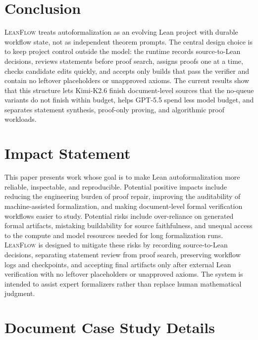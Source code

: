 \documentclass{article}
\newcommand{\method}{\textsc{LeanFlow}\xspace}
\newcommand{\kimi}{Kimi-K2.6\xspace}
\newcommand{\gpt}{GPT-5.5\xspace}
\newcommand{\lean}{Lean\xspace}
\begin{document}
\section{Conclusion}

\method treats autoformalization as an evolving \lean project with durable workflow state, not as independent theorem prompts.
The central design choice is to keep project control outside the model: the runtime records source-to-\lean decisions, reviews statements before proof search, assigns proofs one at a time, checks candidate edits quickly, and accepts only builds that pass the verifier and contain no leftover placeholders or unapproved axioms.
The current results show that this structure lets \kimi finish document-level sources that the no-queue variants do not finish within budget, helps \gpt spend less model budget, and separates statement synthesis, proof-only proving, and algorithmic proof workloads.

\section*{Impact Statement}

This paper presents work whose goal is to make \lean autoformalization more reliable, inspectable, and reproducible.
Potential positive impacts include reducing the engineering burden of proof repair, improving the auditability of machine-assisted formalization, and making document-level formal verification workflows easier to study.
Potential risks include over-reliance on generated formal artifacts, mistaking buildability for source faithfulness, and unequal access to the compute and model resources needed for long formalization runs.
\method is designed to mitigate these risks by recording source-to-\lean decisions, separating statement review from proof search, preserving workflow logs and checkpoints, and accepting final artifacts only after external \lean verification with no leftover placeholders or unapproved axioms.
The system is intended to assist expert formalizers rather than replace human mathematical judgment.




\clearpage
\onecolumn
\appendix
\section{Document Case Study Details}
\label{app:case-studies}
\end{document}
